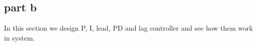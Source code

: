 \subsection{part b}
In this section we design P, I, lead, PD and lag controller and see how them work in system.